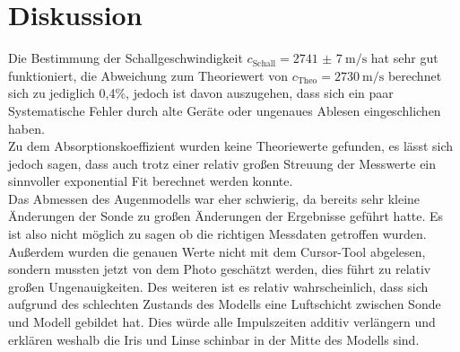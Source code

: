 \section{Diskussion}

    Die Bestimmung der Schallgeschwindigkeit $c_{\text{Schall}} = \SI{2741(7)}{\metre\per\second}$ hat sehr gut funktioniert, die Abweichung zum 
    Theoriewert von $c_{\text{Theo}} = \SI{2730}{\metre\per\second}$ \cite{cA} berechnet sich zu jediglich 0,4\%, jedoch ist davon auszugehen, 
    dass sich ein paar Systematische Fehler durch alte Geräte oder ungenaues Ablesen eingeschlichen haben.\\
    Zu dem Absorptionskoeffizient wurden keine Theoriewerte gefunden, es lässt sich jedoch sagen, dass auch trotz einer relativ großen Streuung 
    der Messwerte ein sinnvoller exponential Fit berechnet werden konnte.\\
    Das Abmessen des Augenmodells war eher schwierig, da bereits sehr kleine Änderungen der Sonde zu großen Änderungen der Ergebnisse geführt 
    hatte. Es ist also nicht möglich zu sagen ob die richtigen Messdaten getroffen wurden. Außerdem wurden die genauen Werte nicht mit dem 
    Cursor-Tool abgelesen, sondern mussten jetzt von dem Photo geschätzt werden, dies führt zu relativ großen Ungenauigkeiten.
    Des weiteren ist es relativ wahrscheinlich, dass sich aufgrund des schlechten Zustands des Modells eine Luftschicht zwischen Sonde und Modell 
    gebildet hat. Dies würde alle Impulszeiten additiv verlängern und erklären weshalb die Iris und Linse schinbar in der Mitte des Modells sind.
    
